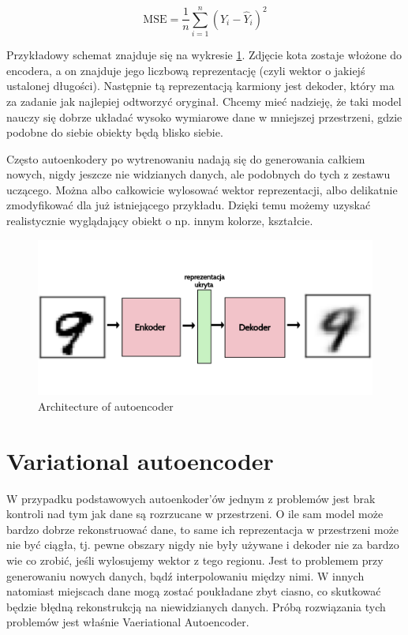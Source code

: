 $$
\mathrm { MSE } = \frac { 1 } { n } \sum _ { i = 1 } ^ { n } \left( Y _ { i } - \hat { Y } _ { i } \right) ^ { 2 }
$$

Przykładowy schemat znajduje się na wykresie \ref{fig:autoenc}. Zdjęcie kota zostaje włożone do encodera, a on znajduje jego liczbową reprezentację (czyli wektor o jakiejś ustalonej długości). Następnie tą reprezentacją karmiony jest dekoder, który ma za zadanie jak najlepiej odtworzyć oryginał. Chcemy mieć nadzieję, że taki model nauczy się dobrze układać wysoko wymiarowe dane w mniejszej przestrzeni, gdzie podobne do siebie obiekty będą blisko siebie. 

Często autoenkodery po wytrenowaniu nadają się do generowania całkiem nowych, nigdy jeszcze nie widzianych danych, ale podobnych do tych z zestawu uczącego. Można albo całkowicie wylosować wektor reprezentacji, albo delikatnie zmodyfikować dla już istniejącego przykładu. Dzięki temu możemy uzyskać realistycznie wyglądający obiekt o np. innym kolorze, kształcie. 

\begin{figure}[h!]
    \centering
    \includegraphics[width=1\textwidth]{images/autoenc}
    \caption{Architecture of autoencoder}
    \label{fig:autoenc}
\end{figure}

\section{Variational autoencoder}

W przypadku podstawowych autoenkoder'ów jednym z problemów jest brak kontroli nad tym jak dane są rozrzucane w przestrzeni. O ile sam model może bardzo dobrze rekonstruować dane, to same ich reprezentacja w przestrzeni może nie być ciągła, tj. pewne obszary nigdy nie były używane i dekoder nie za bardzo wie co zrobić, jeśli wylosujemy wektor z tego regionu. Jest to problemem przy generowaniu nowych danych, bądź interpolowaniu między nimi. W innych natomiast miejscach dane mogą zostać poukładane zbyt ciasno, co skutkować będzie błędną rekonstrukcją na niewidzianych danych. Próbą rozwiązania tych problemów jest właśnie Vaeriational Autoencoder.

